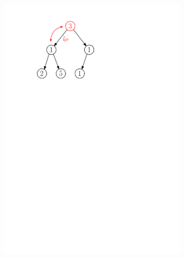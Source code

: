 \begin{figure}[h]
\begin{subfigure}{5cm}
        \includegraphics[scale=.5]{01-grafalgo/images/ch01_odebirani_3}
    \end{subfigure}
    \begin{subfigure}{5cm}

\end{subfigure}
\end{figure}
